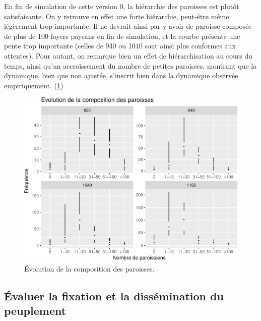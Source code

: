 
\begin{mdframed}[backgroundcolor=gray!10,footnoteinside=false]
En fin de simulation de cette version 0, la hiérarchie des paroisses est plutôt satisfaisante.
On y retrouve en effet une forte hiérarchie, peut-être même légèrement trop importante.
Il ne devrait ainsi par y avoir de paroisse composée de plus de $100$ foyers paysans en fin de simulation, et la courbe présente une pente trop importante (celles de 940 ou 1040 sont ainsi plus conformes aux attentes).
Pour autant, on remarque bien un effet de hiérarchisation au cours du temps, ainsi qu'un accroissement du nombre de petites paroisses, montrant que la dynamique, bien que non ajustée, s'inscrit bien dans la dynamique observée empiriquement.
(\cref{fig:compo-paroisses-v0})
\end{mdframed}

\begin{figure}[H]
\captionsetup{width=\linewidth}
\includegraphics[width=\linewidth]{img/resultats/v0_compo_paroisses.pdf}
\caption{Évolution de la composition des paroisses.} 
\label{fig:compo-paroisses-v0} 
\end{figure}

\clearpage

\subsection{Évaluer la fixation et la dissémination du peuplement}


